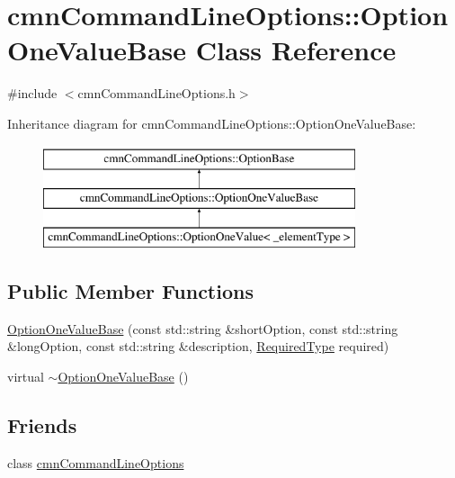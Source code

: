 \hypertarget{classcmn_command_line_options_1_1_option_one_value_base}{}\section{cmn\+Command\+Line\+Options\+:\+:Option\+One\+Value\+Base Class Reference}
\label{classcmn_command_line_options_1_1_option_one_value_base}


{\ttfamily \#include $<$cmn\+Command\+Line\+Options.\+h$>$}

Inheritance diagram for cmn\+Command\+Line\+Options\+:\+:Option\+One\+Value\+Base\+:\begin{figure}[H]
\begin{center}
\leavevmode
\includegraphics[height=3.000000cm]{da/dde/classcmn_command_line_options_1_1_option_one_value_base}
\end{center}
\end{figure}
\subsection*{Public Member Functions}
\begin{DoxyCompactItemize}
\item 
\hyperlink{classcmn_command_line_options_1_1_option_one_value_base_a420e8ef264723125fe3cc75fc13dbc57}{Option\+One\+Value\+Base} (const std\+::string \&short\+Option, const std\+::string \&long\+Option, const std\+::string \&description, \hyperlink{group__cisst_common_gac239a3ca62dd4e3b391824f6f1a97c76}{Required\+Type} required)
\item 
virtual \hyperlink{classcmn_command_line_options_1_1_option_one_value_base_a15fa4e68a55b12567ed5ad51a4bd1161}{$\sim$\+Option\+One\+Value\+Base} ()
\end{DoxyCompactItemize}
\subsection*{Friends}
\begin{DoxyCompactItemize}
\item 
class \hyperlink{classcmn_command_line_options_1_1_option_one_value_base_a18923f23ed3914806f1edf878a64b422}{cmn\+Command\+Line\+Options}
\end{DoxyCompactItemize}
